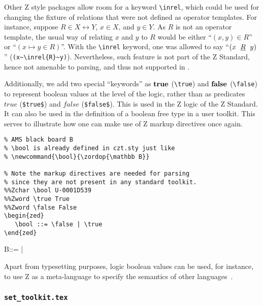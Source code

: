 \documentclass{article}
\newcommand{\emfile}[1]{\texttt{#1}}%
\newcommand{\settkfile}{\emfile{set\_toolkit.tex}}
\def\gives{\endquote\endgroup\egroup}
\def \bool       {\mathbb B}
\def\inrel#1{\zrelop{{\underline{#1}}}}
\begin{document}
Other Z style packages allow room for a keyword \verb|\inrel|, which could be used for changing
the fixture of relations that were not defined as operator templates. For instance, suppose
$R \in X \rel Y$, $x \in X$, and $y \in Y$. As $R$ is not an operator template, the usual
way of relating $x$ and $y$ to $R$ would be either ``\mbox{$(x,y) \in R$}'' or ``\mbox{$(x \mapsto y \in R)$}''.
With the \verb|\inrel| keyword, one was allowed to say ``\mbox{$(x~\inrel{R}~y)$}'' (\verb|(x~\inrel{R}~y)|).
Nevertheless, such feature is not part of the Z Standard, hence not amenable to parsing, and thus
not supported in \cztstylefile.

Additionally, we add two special ``keywords'' as $\true$ (\verb|\true|) and $\false$ (\verb|\false|)
to represent boolean values at the level of the logic, rather than as predicates $true$ (\verb|$true$|)
and $false$ (\verb|$false$|). This is used in the Z logic of the Z Standard. It can also be used in the
definition of a boolean free type in a user toolkit. This serves to illustrate how one can make use of
Z markup directives once again.
%
\begin{demo}
\begin{verbatim}
% AMS black board B
% \bool is already defined in czt.sty just like
% \newcommand{\bool}{\zordop{\mathbb B}}

% Note the markup directives are needed for parsing
% since they are not present in any standard toolkit.
%%Zchar \bool U-0001D539
%%Zword \true True
%%Zword \false False
\begin{zed}
   \bool ::= \false | \true
\end{zed}
\end{verbatim}
\gives

\begin{zed}
   \bool ::= \false | \true
\end{zed}
\end{demo}
%
Apart from typesetting purposes, logic boolean values can be used, for instance,
to use Z as a meta-language to specify the semantics of other languages~\cite{circussem}.

\subsubsection{\settkfile}\label{sec:symbol-toolkit-set}
\end{document}
